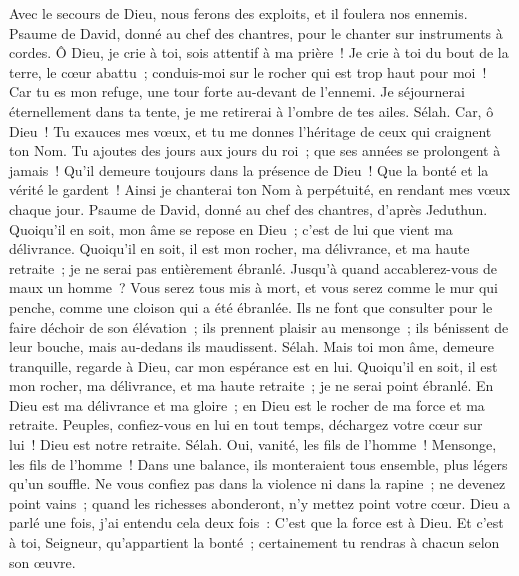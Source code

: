 \begin{multicols}{2}
Avec le secours de Dieu, nous ferons des exploits, et il foulera nos ennemis.
\VerseOne{}Psaume de David, donné au chef des chantres, pour le chanter sur instruments à cordes.
Ô Dieu, je crie à toi, sois attentif à ma prière~!
Je crie à toi du bout de la terre, le cœur abattu~; conduis-moi sur le rocher qui est trop haut pour moi~!
Car tu es mon refuge, une tour forte au-devant de l'ennemi.
Je séjournerai éternellement dans ta tente, je me retirerai à l'ombre de tes ailes. Sélah.
Car, ô Dieu~! Tu exauces mes vœux, et tu me donnes l'héritage de ceux qui craignent ton Nom.
Tu ajoutes des jours aux jours du roi~; que ses années se prolongent à jamais~!
Qu'il demeure toujours dans la présence de Dieu~! Que la bonté et la vérité le gardent~!
Ainsi je chanterai ton Nom à perpétuité, en rendant mes vœux chaque jour.
\VerseOne{}Psaume de David, donné au chef des chantres, d'après Jeduthun.
Quoiqu'il en soit, mon âme se repose en Dieu~; c'est de lui que vient ma délivrance.
Quoiqu'il en soit, il est mon rocher, ma délivrance, et ma haute retraite~; je ne serai pas entièrement ébranlé.
Jusqu'à quand accablerez-vous de maux un homme~? Vous serez tous mis à mort, et vous serez comme le mur qui penche, comme une cloison qui a été ébranlée.
Ils ne font que consulter pour le faire déchoir de son élévation~; ils prennent plaisir au mensonge~; ils bénissent de leur bouche, mais au-dedans ils maudissent. Sélah.
Mais toi mon âme, demeure tranquille, regarde à Dieu, car mon espérance est en lui.
Quoiqu'il en soit, il est mon rocher, ma délivrance, et ma haute retraite~; je ne serai point ébranlé.
En Dieu est ma délivrance et ma gloire~; en Dieu est le rocher de ma force et ma retraite.
Peuples, confiez-vous en lui en tout temps, déchargez votre cœur sur lui~! Dieu est notre retraite. Sélah.
Oui, vanité, les fils de l'homme~! Mensonge, les fils de l'homme~! Dans une balance, ils monteraient tous ensemble, plus légers qu'un souffle.
Ne vous confiez pas dans la violence ni dans la rapine~; ne devenez point vains~; quand les richesses abonderont, n'y mettez point votre cœur.
Dieu a parlé une fois, j'ai entendu cela deux fois~: C'est que la force est à Dieu.
Et c'est à toi, Seigneur, qu'appartient la bonté~; certainement tu rendras à chacun selon son œuvre.

\end{multicols}
